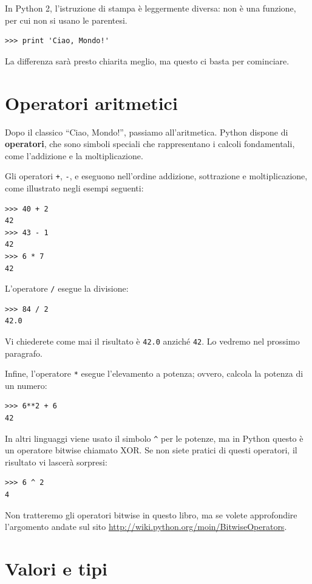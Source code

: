 \documentclass[10pt]{book}
\begin{document}
In Python 2, l'istruzione di stampa è leggermente diversa: non è una funzione, per cui non si usano le parentesi.
\begin{verbatim}
>>> print 'Ciao, Mondo!'
\end{verbatim}
%
La differenza sarà presto chiarita meglio, ma questo ci basta per cominciare.

\section{Operatori aritmetici}

Dopo il classico ``Ciao, Mondo!'', passiamo all'aritmetica. Python dispone di
{\bf operatori}, che sono simboli speciali che rappresentano i calcoli fondamentali, come l'addizione e la moltiplicazione.

Gli operatori {\tt +}, {\tt -}, e {\tt *} eseguono nell'ordine addizione, sottrazione e moltiplicazione, come illustrato negli esempi seguenti:

\begin{verbatim}
>>> 40 + 2
42
>>> 43 - 1
42
>>> 6 * 7
42
\end{verbatim}
%
L'operatore {\tt /} esegue la divisione:

\begin{verbatim}
>>> 84 / 2
42.0
\end{verbatim}
%
Vi chiederete come mai il risultato è {\tt 42.0} anziché {\tt 42}.
Lo vedremo nel prossimo paragrafo.

Infine, l'operatore {\tt **} esegue l'elevamento a potenza; ovvero, calcola la potenza di un numero:

\begin{verbatim}
>>> 6**2 + 6
42
\end{verbatim}
%
In altri linguaggi viene usato il simbolo \verb"^" per le potenze, ma in Python questo è un operatore bitwise chiamato XOR.  Se non siete pratici di questi operatori, il risultato vi lascerà sorpresi:

\begin{verbatim}
>>> 6 ^ 2
4
\end{verbatim}
%
Non tratteremo gli operatori bitwise in questo libro, ma se volete approfondire l'argomento andate sul sito \url{http://wiki.python.org/moin/BitwiseOperators}.

\section{Valori e tipi}
\end{document}
